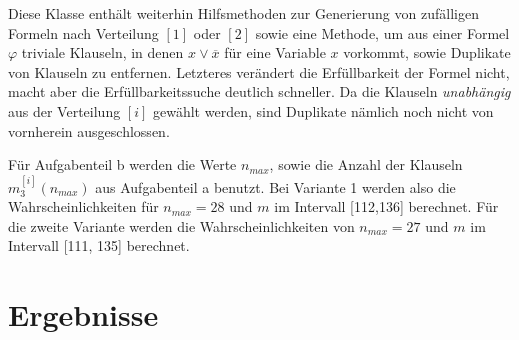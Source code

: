 \documentclass[maincolor=black]{exercise}
\newcommand{\non}[1]{\overline{#1}}
\begin{document}
Diese Klasse enthält weiterhin Hilfsmethoden zur Generierung von zufälligen Formeln nach Verteilung $[1]$ oder $[2]$ sowie eine Methode, um aus einer Formel $\varphi$ triviale Klauseln, in denen $x \vee \non{x}$ für eine Variable $x$ vorkommt, sowie Duplikate von Klauseln zu entfernen. Letzteres verändert die Erfüllbarkeit der Formel nicht, macht aber die Erfüllbarkeitssuche deutlich schneller. Da die Klauseln \emph{unabhängig} aus der Verteilung $[i]$ gewählt werden, sind Duplikate nämlich noch nicht von vornherein ausgeschlossen.\par
Für Aufgabenteil b werden die Werte $n_{max}$, sowie die Anzahl der Klauseln $m_3^{[i]}(n_{max})$ aus Aufgabenteil a benutzt. Bei Variante 1 werden also die Wahrscheinlichkeiten für $n_{max} = 28$ und $m$ im Intervall [112,136] berechnet. Für die zweite Variante werden die Wahrscheinlichkeiten von $n_{max} = 27$ und $m$ im Intervall [111, 135] berechnet.

\section*{Ergebnisse}
\end{document}
